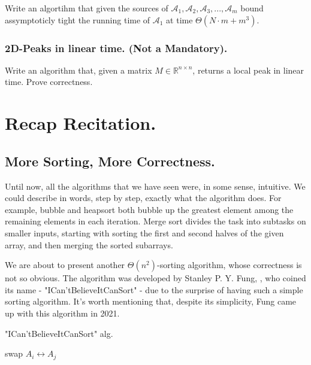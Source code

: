 Write an algortihm that given the sources of $\mathcal{A}_{1},\mathcal{A}_{2},\mathcal{A}_{3},...,\mathcal{A}_{m}$ bound assymptoticly tight the running time of $\mathcal{A}_{1}$ at time $\Theta\left( N\cdot m + m^{3} \right)$. 


\subsection{2D-Peaks in linear time. (Not a Mandatory).} Write an algorithm that, given a matrix $M \in \mathbb{R}^{n\times n}$, returns a local peak in linear time. Prove correctness.

\ifdefined\SOLUTION

\fi 
\ifdefined\Book
\fi




\ifdefined\BOOK
\else
\setcounter{chapter}{4}
\fi
\chapter{Recap Recitation.} 



\section{More Sorting, More Correctness.}
Until now, all the algorithms that we have seen were, in some sense, intuitive. We could describe in words, step by step, exactly what the algorithm does. For example, bubble and heapsort both bubble up the greatest element among the remaining elements in each iteration. Merge sort divides the task into subtasks on smaller inputs, starting with sorting the first and second halves of the given array, and then merging the sorted subarrays.

We are about to present another $\Theta(n^{2})$-sorting algorithm, whose correctness is not so obvious. The algorithm was developed by Stanley P. Y. Fung, \cite{Simplesort}, who coined its name - "ICan'tBelieveItCanSort" - due to the surprise of having such a simple sorting algorithm. It's worth mentioning that, despite its simplicity, Fung came up with this algorithm in 2021.


\begin{algorithm}
\SetAlgoLined
{}
\caption{ "ICan'tBelieveItCanSort"  alg.}
 {
   {
     {
      swap $A_{i} \leftrightarrow A_{j}$
    }
  }
}


\end{algorithm}

